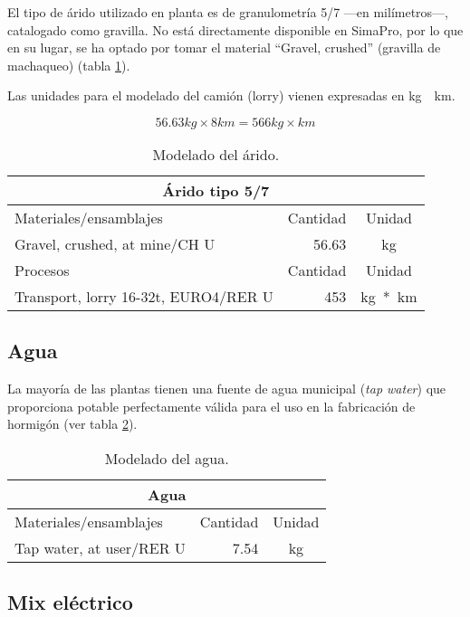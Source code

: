 El tipo de árido utilizado en planta es de granulometría 5/7 —en milímetros—, catalogado como gravilla. No está directamente disponible en SimaPro, por lo que en su lugar, se ha optado por tomar el material ``Gravel, crushed'' (gravilla de machaqueo) (tabla \ref{modeladodearido}).

Las unidades para el modelado del camión (lorry) vienen expresadas en \si{kg\times km}.

\begin{equation}
56.63 kg \times 8 km = 566 kg\times km
\end{equation}

\begin{table}[!htb]
\centering
\begin{tabular}{p{8cm}rc}
\toprule
\multicolumn{3}{c}{Árido tipo 5/7}\\
\midrule
Materiales/ensamblajes & Cantidad & Unidad\\
\midrule
Gravel, crushed, at mine/CH U & 56.63 & \si{kg}\\
\midrule
Procesos & Cantidad & Unidad\\
\midrule
Transport, lorry 16-32t, EURO4/RER U & 453 & \si{kg*km}\\
\bottomrule
\end{tabular}
\caption{Modelado del árido.}
\label{modeladodearido}
\end{table}

\subsection{Agua}
La mayoría de las plantas tienen una fuente de agua municipal (\textit{tap water}) que proporciona potable perfectamente válida para el uso en la fabricación de hormigón (ver tabla \ref{modeladodelagua}).

\begin{table}[!htb]
\centering
\begin{tabular}{p{8cm}rc}
\toprule
\multicolumn{3}{c}{Agua}\\
\midrule
Materiales/ensamblajes & Cantidad & Unidad\\
\midrule
Tap water, at user/RER U & 7.54 & \si{kg}\\
\bottomrule
\end{tabular}
\caption{Modelado del agua.}
\label{modeladodelagua}
\end{table}

\subsection{Mix eléctrico}

